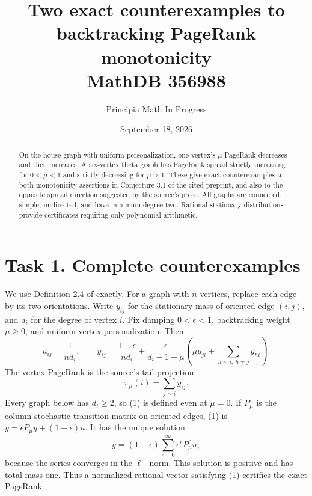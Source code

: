 \documentclass[11pt]{article}
\title{Two exact counterexamples to backtracking PageRank monotonicity\\\large MathDB 356988}
\author{Principia Math In Progress}
\date{September 18, 2026}
\begin{document}
\maketitle
\begin{abstract}
On the house graph with uniform personalization, one vertex's
$\mu$-PageRank decreases and then increases. A six-vertex
theta graph has PageRank spread strictly increasing for $0<\mu<1$
and strictly decreasing for $\mu>1$. These give exact counterexamples
to both monotonicity assertions in Conjecture 3.1 of the cited
preprint, and also to the opposite spread direction suggested
by the source's prose. All graphs are connected, simple, undirected,
and have minimum degree two. Rational stationary distributions provide
certificates requiring only polynomial arithmetic.
\end{abstract}

\section*{Task 1. Complete counterexamples}
We use Definition 2.4 of \cite{GJKO} exactly. For a graph with $n$
vertices, replace each edge by its two orientations. Write $y_{ij}$
for the stationary mass of oriented edge $(i,j)$, and $d_i$ for
the degree of vertex $i$. Fix damping $0<\epsilon<1$, backtracking
weight $\mu\ge0$, and uniform vertex personalization. Then
\[
 u_{ij}=\frac1{nd_i},\qquad
 y_{ij}=\frac{1-\epsilon}{nd_i}+
 \frac{\epsilon}{d_i-1+\mu}
 \left(\mu y_{ji}+\sum_{h\sim i,\ h\ne j}y_{hi}\right).          \tag{1}
\]
The vertex PageRank is the source's tail projection
\[
 \pi_\mu(i)=\sum_{j\sim i}y_{ij}.                              \tag{2}
\]
Every graph below has $d_i\ge2$, so (1) is defined even at $\mu=0$.
If $P_\mu$ is the column-stochastic transition matrix on oriented
edges, (1) is $y=\epsilon P_\mu y+(1-\epsilon)u$. It has the unique
solution
\[
 y=(1-\epsilon)\sum_{r=0}^{\infty}\epsilon^rP_\mu^r u,          \tag{3}
\]
because the series converges in the $\ell^1$ norm. This solution
is positive and has total mass one. Thus a normalized rational
vector satisfying (1) certifies the exact PageRank.
\end{document}
